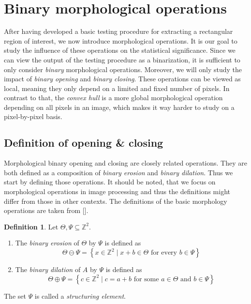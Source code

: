 \documentclass[a4paper,12pt]{article}
\theoremstyle{plain}
\theoremstyle{definition}
\newtheorem{definition}[theorem]{Definition}
\begin{document}
\newpage

\section{Binary morphological operations}\label{sectionmorphologicaloperations}

After having developed a basic testing procedure for extracting a rectangular region of interest, we now introduce morphological operations. It is our goal to study the influence of these operations on the statistical significance. Since we can view the output of the testing procedure as a binarization, it is sufficient to only consider \emph{binary} morphological operations. Moreover, we will only study the impact of \emph{binary opening} and \emph{binary closing}. These operations can be viewed as local, meaning they only depend on a limited and fixed number of pixels. In contrast to that, the \emph{convex hull} is a more global morphological operation depending on all pixels in an image, which makes it way harder to study on a pixel-by-pixel basis.

\subsection{Definition of opening \& closing}

Morphological binary opening and closing are closely related operations. They are both defined as a composition of \emph{binary erosion} and \emph{binary dilation}. Thus we start by defining those operations. It should be noted, that we focus on morphological operations in image processing and thus the definitions might differ from those in other contexts. The definitions of the basic morphology operations are taken from [].

\begin{definition}
	Let $\Theta, \Psi \subseteq \mathbb{Z}^2$.
	\begin{enumerate}
		\item The \emph{binary erosion} of $\Theta$ by $\Psi$ is defined as
		\begin{equation*}
			\Theta \ominus \Psi = \left\{ x \in \mathbb{Z}^2 \mid x + b \in \Theta \textrm{ for every } b \in \Psi \right\}
		\end{equation*}
		\item The \emph{binary dilation} of $A$ by $\Psi$ is defined as
		\begin{equation*}
			\Theta \oplus \Psi = \left\{ c \in \mathbb{Z}^2 \mid c = a + b \textrm{ for some } a \in \Theta \textrm{ and } b \in \Psi \right\}
		\end{equation*}
	\end{enumerate}
	The set $\Psi$ is called a \emph{structuring element}.
\end{definition}
\end{document}
